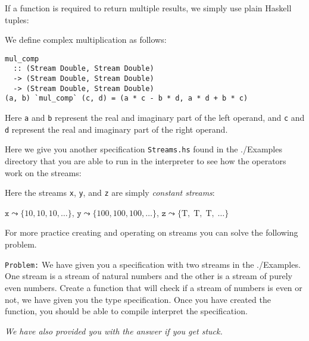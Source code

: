 If a function is required to return multiple results, we simply use plain
Haskell tuples:

\begin{example}
We define complex multiplication as follows:
%
\begin{lstlisting}[language = Copilot, frame = single]
mul_comp
  :: (Stream Double, Stream Double)
  -> (Stream Double, Stream Double)
  -> (Stream Double, Stream Double)
(a, b) `mul_comp` (c, d) = (a * c - b * d, a * d + b * c)
\end{lstlisting}
%
Here {\tt a} and {\tt b} represent the real and imaginary part of the left
operand, and {\tt c} and {\tt d} represent the real and imaginary part
of the right operand.
\end{example}

Here we give you another specification \texttt{Streams.hs} found in the ./Examples directory
that you are able to run in the interpreter to see how the operators work on the streams:

\noindent




\noindent Here the streams {\tt x}, {\tt y}, and {\tt z} are simply
\emph{constant streams}:

\begin{center} $\mathtt{x} \leadsto \{10, 10, 10, \dots \}$, $\mathtt{y}
\leadsto \{100, 100, 100,  \dots \}$, $\mathtt{z} \leadsto \{\mbox{T},\;
\mbox{T},\; \mbox{T},\; \dots \}$ \end{center}

\noindent For more practice creating and operating on streams you can solve the
following problem. 


{\tt Problem:} We have given you a specification with two streams in the
./Examples.
%
One stream is a stream of natural numbers and the other is a stream of purely
even numbers.
%
Create a function that will check if a stream of numbers is even or not, we
have given you the type specification.
%
Once you have created the function, you should be able to compile interpret the
specification.
%

\emph{We have also provided you with the answer if you get stuck.}
%



